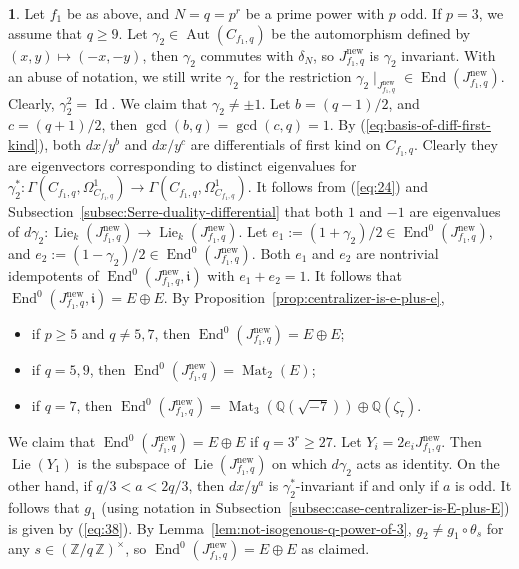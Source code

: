 \documentclass{amsart}[11pt]
\theoremstyle{definition}
\newtheorem{sect}[thm]{}
\numberwithin{equation}{section}
\theoremstyle{notitle}
\begin{document}
 \begin{sect}
   Let $f_1$ be as above, and $N=q=p^r$ be a prime power with $p$
   odd. If $p=3$, we assume that $q\geq 9$. Let $\gamma_2\in
   \operatorname{Aut}(C_{f_1, q})$ be the automorphism defined by $(x,y)\mapsto (-x,
   -y)$, then $\gamma_2$ commutes with $\delta_N$, so $J_{f_1, q}^{\mathrm{new}}$
   is $\gamma_2$ invariant. With an abuse of notation, we still write
   $\gamma_2$ for the restriction $\gamma_2\mid_{J_{f_1,
       q}^{\mathrm{new}}}\in \operatorname{End}(J_{f_1, q}^{\mathrm{new}})$. Clearly, $\gamma_2^2=\operatorname{Id}$. We
   claim that $\gamma_2\neq \pm 1$.  Let $b= (q-1)/2$, and $c=
   (q+1)/2$, then $\gcd(b,q)=\gcd(c,q)=1$.  By
   (\ref{eq:basis-of-diff-first-kind}), both $dx/y^b$ and $dx/y^c$ are
   differentials of first kind on $C_{f_1, q}$. Clearly they are
   eigenvectors 
   corresponding to distinct eigenvalues for
   $\gamma_2^*:\Gamma(C_{f_1,q}, \Omega^1_{C_{f_1,q}})\to 
   \Gamma(C_{f_1,q}, \Omega^1_{C_{f_1,q}})$.  It follows
   from (\ref{eq:24}) and
   Subsection~\ref{subsec:Serre-duality-differential} that both $1$
   and $-1$ are eigenvalues of $d\gamma_2: \operatorname{Lie}_k(J_{f_1, q}^{\mathrm{new}})\to
   \operatorname{Lie}_k(J_{f_1, q}^{\mathrm{new}})$. Let $e_1:=
   (1+\gamma_2)/2\in \operatorname{End}^0(J_{f_1,q}^{\mathrm{new}})$, and
   $e_2:=(1-\gamma_2)/2\in \operatorname{End}^0(J_{f_1,q}^{\mathrm{new}})$. Both $e_1$ and
   $e_2$ are nontrivial idempotents of $\operatorname{End}^0(J_{f_1,q}^{\mathrm{new}},{\mathfrak{i}})$
   with $e_1+e_2=1$. 
   It follows that $\operatorname{End}^0(J_{f_1,q}^{\mathrm{new}},{\mathfrak{i}})=E\oplus E$. By
   Proposition~\ref{prop:centralizer-is-e-plus-e},
  \begin{itemize}
  \item if $p\geq 5$ and $q\neq 5, 7$, then $\operatorname{End}^0(J_{f_1,q}^{\mathrm{new}})= E\oplus E$;
  \item if $q=5, 9$, then $\operatorname{End}^0(J_{f_1,q}^{\mathrm{new}})= \operatorname{Mat}_2(E)$; 
  \item if $q=7$, then $\operatorname{End}^0(J_{f_1,q}^{\mathrm{new}})=
    \operatorname{Mat}_3({\mathbb{Q}}(\sqrt{-7}))\oplus {\mathbb{Q}}(\zeta_7)$.
  \end{itemize}

  
  
  
  

  We claim that $\operatorname{End}^0(J_{f_1,q}^{\mathrm{new}})=E\oplus E$ if $q=3^r\geq
  27$. Let $Y_i=2e_i J_{f_1, q}^{\mathrm{new}}$. Then $\operatorname{Lie}(Y_1)$ is the subspace
  of $\operatorname{Lie}(J_{f_1, q}^{\mathrm{new}})$ on which $d\gamma_2$ acts as identity.  On
  the other hand, if $q/3< a <2q/3$, then $dx/y^a$ is
  $\gamma_2^*$-invariant if and only if $a$ is odd. It follows that
  $g_1$ (using notation in
  Subsection~\ref{subsec:case-centralizer-is-E-plus-E}) is given by
  (\ref{eq:38}). By Lemma~\ref{lem:not-isogenous-q-power-of-3},
  $g_2\neq g_1\circ \theta_s$ for any $s\in {(\mathbb{Z}/ {q}\, \mathbb{Z})^\times}$, so
  $\operatorname{End}^0(J_{f_1,q}^{\mathrm{new}})=E\oplus E$ as claimed.
 \end{sect}
\end{document}
